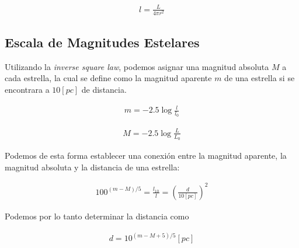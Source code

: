 \documentclass{tufte-handout}
\begin{document}
\begin{align}
  l = \frac{L}{4\pi r^2}
\end{align}

\subsection{Escala de Magnitudes Estelares}

Utilizando la \emph{inverse square law}, podemos asignar una magnitud absoluta $M$ a cada estrella, la cual se define como la magnitud aparente $m$ de una estrella si se encontrara a $10 [pc]$ de distancia.


\begin{align}
  m = -2.5 \log{\frac{l}{l_0}}
\end{align}

\begin{align}
  M = -2.5 \log{\frac{L}{L_0}}
\end{align}

Podemos de esta forma establecer una conexión entre la magnitud aparente, la magnitud absoluta y la distancia de una estrella:

\begin{align}
  100^{(m - M)/5} = \frac{l_{10}}{l} = (\frac{d}{10 [pc]})^2
\end{align}

Podemos por lo tanto determinar la distancia como

\begin{align}
  d = 10^{(m - M + 5)/5} [pc]
\end{align}

\end{document}
